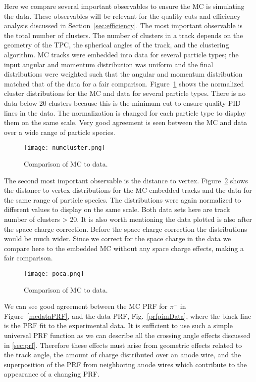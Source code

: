 Here we compare several important observables to ensure the MC is simulating the data. These observables will be relevant for the quality cuts and efficiency analysis discussed in Section~\ref{sec:efficiency}. The most important observable is the total number of clusters. The number of clusters in a track depends on the geometry of the TPC, the spherical angles of the track, and the clustering algorithm. MC tracks were embedded into data for several particle types; the input angular and momentum distribution was uniform and the final distributions were weighted such that the angular and momentum distribution matched that of the data for a fair comparison. Figure~\ref{fig:clustcomp} shows the normalized cluster distributions for the MC and data for several particle types. There is no data below 20 clusters because this is the minimum cut to ensure quality PID lines in the data. The normalization is changed for each particle type to display them on the same scale. Very good agreement is seen between the MC and data over a wide range of particle species. 

\begin{figure}[!hbt]
\texttt{[image: numcluster.png]}
\caption{Comparison of MC to data.}
\label{fig:clustcomp}
\end{figure}

The second most important observable is the distance to vertex. Figure~\ref{fig:pocacomp} shows the distance to vertex distributions for the MC embedded tracks and the data for the same range of particle species. The distributions were again normalized to different values to display on the same scale. Both data sets here are track number of clusters > 20. It is also worth mentioning the data plotted is also after the space charge correction. Before the space charge correction the distributions would be much wider. Since we correct for the space charge in the data we compare here to the embedded MC without any space charge effects, making a fair comparison. 

\begin{figure}[!hbt]
\texttt{[image: poca.png]}
\caption{Comparison of MC to data.}
\label{fig:pocacomp}
\end{figure}


We can see good agreement between the MC PRF for $\pi^-$ in Figure~\ref{mcdataPRF}, and the data PRF, Fig.~\ref{prfpimData}, where the black line is the PRF fit to the experimental data. It is sufficient to use such a simple universal PRF function as we can describe all the crossing angle effects discussed in \ref{sec:prf}. Therefore these effects must arise from geometric effects related to the track angle, the amount of charge distributed over an anode wire, and the superposition of the PRF from neighboring anode wires which contribute to the appearance of a changing PRF.


